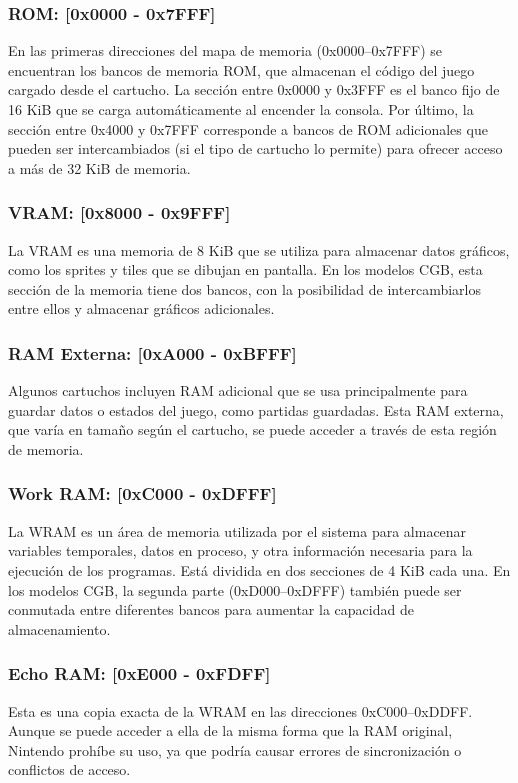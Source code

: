 \subsubsection{ROM: [0x0000 - 0x7FFF]}
En las primeras direcciones del mapa de memoria (0x0000–0x7FFF) se encuentran los bancos de memoria ROM, que almacenan el código del juego cargado desde el cartucho. La sección entre 0x0000 y 0x3FFF es el banco fijo de 16 KiB que se carga automáticamente al encender la consola. Por último, la sección entre 0x4000 y 0x7FFF corresponde a bancos de ROM adicionales que pueden ser intercambiados (si el tipo de cartucho lo permite) para ofrecer acceso a más de 32 KiB de memoria.

\subsubsection{VRAM: [0x8000 - 0x9FFF]}
La VRAM es una memoria de 8 KiB que se utiliza para almacenar datos gráficos, como los sprites y tiles que se dibujan en pantalla. En los modelos CGB, esta sección de la memoria tiene dos bancos, con la posibilidad de intercambiarlos entre ellos y almacenar gráficos adicionales.

\subsubsection{RAM Externa: [0xA000 - 0xBFFF]}
Algunos cartuchos incluyen RAM adicional que se usa principalmente para guardar datos o estados del juego, como partidas guardadas. Esta RAM externa, que varía en tamaño según el cartucho, se puede acceder a través de esta región de memoria.

\subsubsection{Work RAM: [0xC000 - 0xDFFF]}
La WRAM es un área de memoria utilizada por el sistema para almacenar variables temporales, datos en proceso, y otra información necesaria para la ejecución de los programas. Está dividida en dos secciones de 4 KiB cada una. En los modelos CGB, la segunda parte (0xD000–0xDFFF) también puede ser conmutada entre diferentes bancos para aumentar la capacidad de almacenamiento.

\subsubsection{Echo RAM: [0xE000 - 0xFDFF]}
Esta es una copia exacta de la WRAM en las direcciones 0xC000–0xDDFF. Aunque se puede acceder a ella de la misma forma que la RAM original, Nintendo prohíbe su uso, ya que podría causar errores de sincronización o conflictos de acceso.

